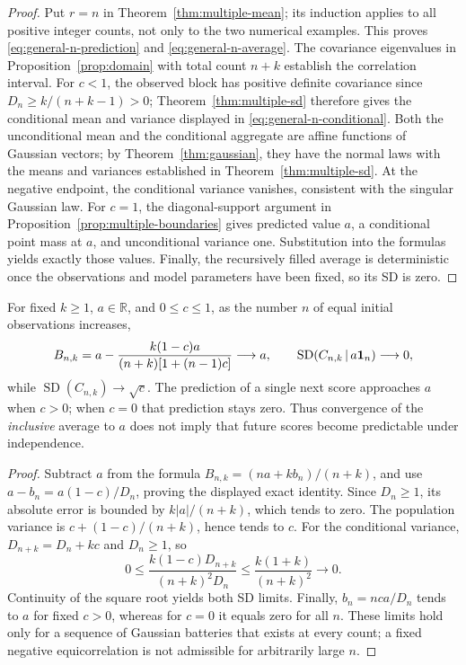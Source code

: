\begin{proof}
Put \(r=n\) in Theorem~\ref{thm:multiple-mean}; its induction applies to
all positive integer counts, not only to the two numerical examples.
This proves \eqref{eq:general-n-prediction} and
\eqref{eq:general-n-average}. The covariance eigenvalues in
Proposition~\ref{prop:domain} with total count \(n+k\) establish the
correlation interval. For \(c<1\), the observed block has positive
definite covariance since
\(D_n\geq k/(n+k-1)>0\); Theorem~\ref{thm:multiple-sd} therefore gives
the conditional mean and variance displayed in
\eqref{eq:general-n-conditional}. Both the unconditional mean and the
conditional aggregate are affine functions of Gaussian vectors; by
Theorem~\ref{thm:gaussian}, they have the normal laws with the means
and variances established in Theorem~\ref{thm:multiple-sd}. At the
negative endpoint, the conditional variance vanishes, consistent with
the singular Gaussian law. For \(c=1\), the diagonal-support argument
in Proposition~\ref{prop:multiple-boundaries} gives predicted value
\(a\), a conditional point mass at \(a\), and unconditional variance
one. Substitution into the formulas yields exactly those values.
Finally, the recursively filled average is deterministic once the
observations and model parameters have been fixed, so its SD is zero.
\end{proof}

\begin{corollary}
\label{cor:many-equal-starts}
For fixed \(k\geq1\), \(a\in\mathbb R\), and \(0\leq c\leq1\), as the
number \(n\) of equal initial observations increases,
\[
 B_{n,k}
 =a-\frac{k(1-c)a}{(n+k)[1+(n-1)c]}
 \longrightarrow a,\qquad
 \operatorname{SD}(C_{n,k}\,\vert\, a\mathbf{1}_n)\longrightarrow0,
\]
while \(\operatorname{SD}(C_{n,k})\longrightarrow\sqrt c\).
The prediction of a single next score approaches \(a\) when \(c>0\);
when \(c=0\) that prediction stays zero. Thus convergence of the
\emph{inclusive} average to \(a\) does not imply that future scores
become predictable under independence.
\end{corollary}
\begin{proof}
Subtract \(a\) from the formula
\(B_{n,k}=(na+kb_n)/(n+k)\), and use
\(a-b_n=a(1-c)/D_n\), proving the displayed exact identity.
Since \(D_n\geq1\), its absolute error is bounded by
\(k|a|/(n+k)\), which tends to zero. The population variance is
\(c+(1-c)/(n+k)\), hence tends to \(c\). For the conditional variance,
\(D_{n+k}=D_n+kc\) and \(D_n\geq1\), so
\[
 0\leq\frac{k(1-c)D_{n+k}}{(n+k)^2D_n}
 \leq\frac{k(1+k)}{(n+k)^2}\longrightarrow0.
\]
Continuity of the square root yields both SD limits. Finally,
\(b_n=nca/D_n\) tends to \(a\) for fixed \(c>0\), whereas for \(c=0\)
it equals zero for all \(n\). These limits hold only for a sequence
of Gaussian batteries that exists at every count; a fixed negative
equicorrelation is not admissible for arbitrarily large \(n\).
\end{proof}

